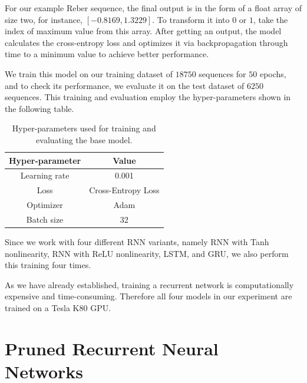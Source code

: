 For our example Reber sequence, the final output is in the form of a float array of size two, for instance, $[-0.8169, 1.3229]$. To transform it into $0$ or $1$, take the index of maximum value from this array. After getting an output, the model calculates the cross-entropy loss and optimizes it via backpropagation through time to a minimum value to achieve better performance.

We train this model on our training dataset of $18750$ sequences for $50$ epochs, and to check its performance, we evaluate it on the test dataset of $6250$ sequences. This training and evaluation employ the hyper-parameters shown in the following table.

\begin{table}[h]
	\centering
	\begin{tabular}{|c|c|}
	    \hline
		\textbf{Hyper-parameter} & \textbf{Value} \\
		\hline
		Learning rate & 0.001 \\
		Loss & Cross-Entropy Loss \\
		Optimizer & Adam \\
		Batch size & 32 \\
		\hline
	\end{tabular}
	\caption[Hyper-parameters used for training and evaluating the base model]{Hyper-parameters used for training and evaluating the base model.}
	\label{tab:hype_param_base}
\end{table}

Since we work with four different RNN variants, namely RNN with Tanh nonlinearity, RNN with ReLU nonlinearity, LSTM, and GRU, we also perform this training four times.

As we have already established, training a recurrent network is computationally expensive and time-consuming. Therefore all four models in our experiment are trained on a Tesla K80 GPU.


\newpage
\section{Pruned Recurrent Neural Networks}\label{section:pruned_rnn}

